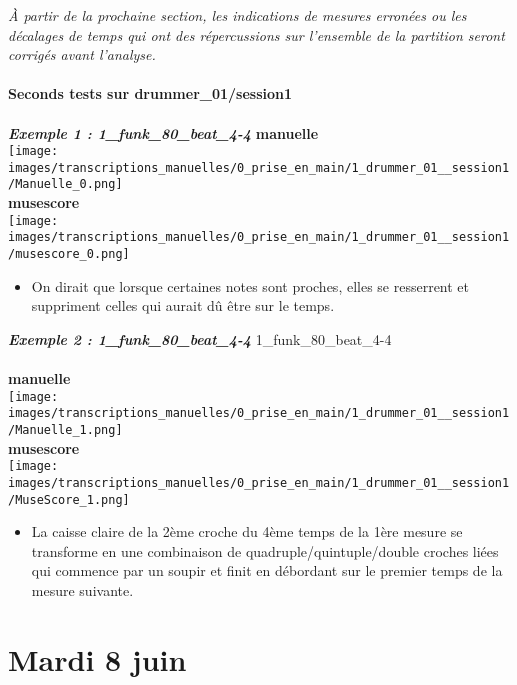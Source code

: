 \documentclass{report}
\begin{document}
	\textit{À partir de la prochaine section, les indications de mesures erronées ou les décalages de temps qui ont des répercussions sur l’ensemble de la partition seront corrigés avant l’analyse.}\\\\
	\textbf{Seconds tests sur drummer\_01/session1}\\\\
	\textbf{\textit{Exemple 1 : 1\_funk\_80\_beat\_4-4}}
	\textbf{manuelle}\\
	\texttt{[image: images/transcriptions\_manuelles/0\_prise\_en\_main/1\_drummer\_01\_\_session1/Manuelle\_0.png]} \\
	\textbf{musescore}\\
	\texttt{[image: images/transcriptions\_manuelles/0\_prise\_en\_main/1\_drummer\_01\_\_session1/musescore\_0.png]} \\
	\begin{itemize}
		\item On dirait que lorsque certaines notes sont proches, elles se resserrent et suppriment celles qui aurait dû être sur le temps.\\
	\end{itemize}
	\textbf{\textit{Exemple 2 : 1\_funk\_80\_beat\_4-4}}
	1\_funk\_80\_beat\_4-4\\\\
	\textbf{manuelle}\\
	\texttt{[image: images/transcriptions\_manuelles/0\_prise\_en\_main/1\_drummer\_01\_\_session1/Manuelle\_1.png]} \\
	\textbf{musescore}\\
	\texttt{[image: images/transcriptions\_manuelles/0\_prise\_en\_main/1\_drummer\_01\_\_session1/MuseScore\_1.png]} \\
	\begin{itemize}
		\item La caisse claire de la 2ème croche du 4ème temps de la 1ère mesure se transforme en une combinaison de quadruple/quintuple/double croches liées qui commence par un soupir et finit en débordant sur le premier temps de la mesure suivante. 
	\end{itemize}
\newpage
	\section{Mardi 8 juin}
\end{document}
